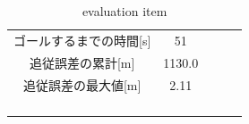 \begin{table}[H]
     \centering
     \caption{evaluation item}
     \begin{tabular}{cclll}
     \multicolumn{1}{c|}{ゴールするまでの時間{[}s{]}}           & 51   &  &  &  \\
     \multicolumn{1}{c|}{追従誤差の累計{[}m{]}} & 1130.0 &  &  &  \\
     \multicolumn{1}{c|}{追従誤差の最大値{[}m{]}} & 2.11 &  &  &  \\
                                                &      &  &  &  \\
                                                &      &  &  &  \\
     \multicolumn{1}{l}{}                       &      &  &  &  \\
     \multicolumn{1}{l}{}                       &      &  &  & 
     \end{tabular}
\end{table}